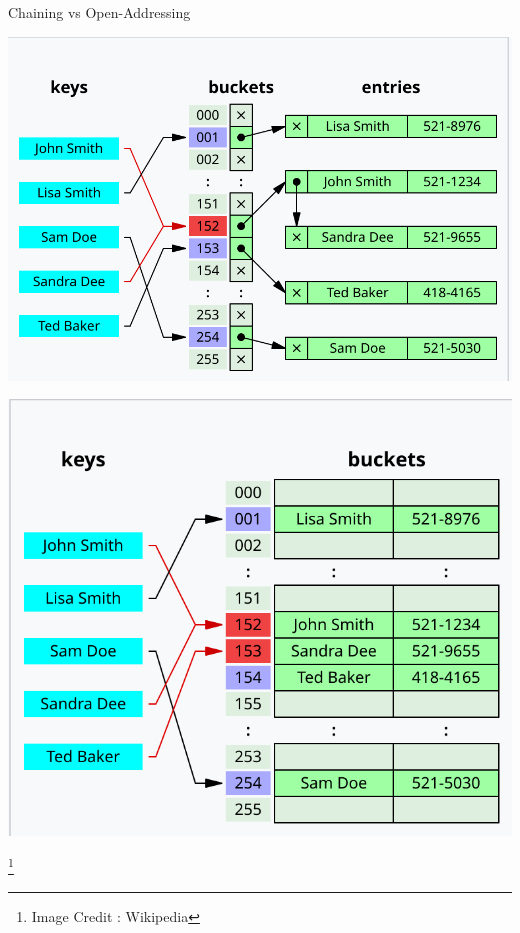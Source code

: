 \documentclass{beamer}
\begin{document}
\begin{frame}{Chaining vs Open-Addressing}
	\centering
	\begin{minipage}{0.48\textwidth}
		\centering
		\includegraphics[width=\linewidth]{chaining.png}
	\end{minipage}
	\hfill
	\begin{minipage}{0.48\textwidth}
		\centering
		\includegraphics[width=\linewidth]{open-addressing.png}
	\end{minipage}
\footnote{Image Credit : Wikipedia}

\end{frame}
\end{document}
